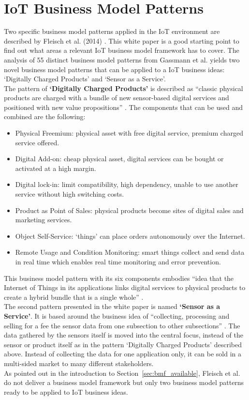\section{IoT Business Model Patterns}
\label{sec:fleisch}	
\vspace{-1em}
	Two specific business model patterns applied in the IoT environment are described by Fleisch et al. (2014) \cite{fleisch}. This white paper is a good starting point to find out what areas a relevant IoT business model framework has to cover. The analysis of 55 distinct business model patterns from Gassmann et al. \cite{gassmann55} yields two novel business model patterns that can be applied to a IoT business ideas: `Digitally Charged Products' and `Sensor as a Service'.\\
	The pattern of \textbf{`Digitally Charged Products'} is described as ``classic physical products are charged with a bundle of new sensor-based digital services and positioned with new value propositions'' \cite{fleisch}. The components that can be used and combined are the following:

	\begin{itemize}
		\item Physical Freemium: physical asset with free digital service, premium charged service offered.
		\item Digital Add-on: cheap physical asset, digital services can be bought or activated at a high margin.
		\item Digital lock-in: limit compatibility, high dependency, unable to use another service without high switching costs.
		\item Product as Point of Sales: physical products become  sites of digital sales and marketing services.
		\item Object Self-Service: `things' can place orders autonomously over the Internet. 
		\item Remote Usage and Condition Monitoring: smart things collect and send data in real time which enables real time monitoring and error prevention.
	\end{itemize}\label{sec:fleisch}

	This business model pattern with its six components embodies ``idea that the Internet of Things in its applications links digital services to physical products to create a hybrid bundle that is a single whole'' \cite{fleisch}.\\
	The second pattern presented in the white paper is named \textbf{`Sensor as a Service'}. It is based around the business idea of ``collecting, processing and selling for a fee the sensor data from one subsection to other subsections'' \cite{fleisch}. The data gathered by the sensors itself is moved into the central focus, instead of the sensor or product itself as in the pattern `Digitally Charged Products' described above. Instead of collecting the data for one application only, it can be sold in a multi-sided market to many different stakeholders.\\
	As pointed out in the introduction to Section~\ref{sec:bmf_available}, Fleisch et al. do not deliver a business model framework but only two business model patterns ready to be applied to IoT business ideas.
	\vspace{-1em}
